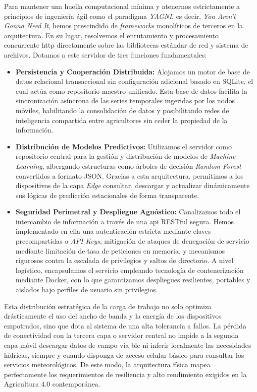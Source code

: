 \begin{enumerate}
    Para mantener una huella computacional mínima y atenernos estrictamente a principios de ingeniería ágil como el paradigma \textit{YAGNI}, es decir, \textit{You Aren't Gonna Need It}, hemos prescindido de \textit{frameworks} monolíticos de terceros en la arquitectura. En su lugar, resolvemos el enrutamiento y procesamiento concurrente \gls{http} directamente sobre las bibliotecas estándar de red y sistema de archivos. Dotamos a este servidor de tres funciones fundamentales:
    \begin{itemize}
        \item \textbf{Persistencia y Cooperación Distribuida:} Alojamos un motor de base de datos relacional transaccional sin configuración adicional basado en SQLite, el cual actúa como repositorio maestro unificado. Esta base de datos facilita la sincronización asíncrona de las series temporales ingeridas por los nodos móviles, habilitando la consolidación de datos y posibilitando redes de inteligencia compartida entre agricultores sin ceder la propiedad de la información.
        \item \textbf{Distribución de Modelos Predictivos:} Utilizamos el servidor como repositorio central para la gestión y distribución de modelos de \textit{Machine Learning}, albergando estructuras como árboles de decisión \textit{Random Forest} convertidos a formato JSON. Gracias a esta arquitectura, permitimos a los dispositivos de la capa \textit{Edge} consultar, descargar y actualizar dinámicamente sus lógicas de predicción estacionales de forma transparente.
        \item \textbf{Seguridad Perimetral y Despliegue Agnóstico:} Canalizamos todo el intercambio de información a través de una \gls{api} RESTful segura. Hemos implementado en ella una autenticación estricta mediante claves precompartidas o \textit{API Keys}, mitigación de ataques de denegación de servicio mediante limitación de tasa de peticiones en memoria, y mecanismos rigurosos contra la escalada de privilegios y saltos de directorio. A nivel logístico, encapsulamos el servicio empleando tecnología de contenerización mediante Docker, con lo que garantizamos despliegues resilientes, portables y aislados bajo perfiles de usuario sin privilegios.
    \end{itemize}
\end{enumerate}

Esta distribución estratégica de la carga de trabajo no solo optimiza drásticamente el uso del ancho de banda y la energía de los dispositivos empotrados, sino que dota al sistema de una alta tolerancia a fallos. La pérdida de conectividad con la tercera capa o servidor central no impide a la segunda capa móvil descargar datos de campo vía \gls{ble} ni inferir localmente las necesidades hídricas, siempre y cuando disponga de acceso celular básico para consultar los servicios meteorológicos. De este modo, la arquitectura física mapea perfectamente los requerimientos de resiliencia y alto rendimiento exigidos en la Agricultura 4.0 contemporánea.

